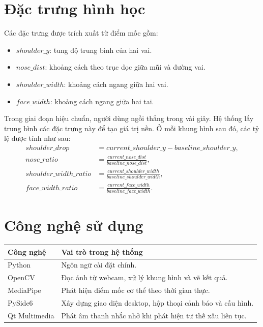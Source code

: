 \documentclass[12pt,a4paper,oneside]{report}
\begin{document}
\section{Đặc trưng hình học}
Các đặc trưng được trích xuất từ điểm mốc gồm:
\begin{itemize}[leftmargin=1.2cm]
    \item $shoulder\_y$: tung độ trung bình của hai vai.
    \item $nose\_dist$: khoảng cách theo trục dọc giữa mũi và đường vai.
    \item $shoulder\_width$: khoảng cách ngang giữa hai vai.
    \item $face\_width$: khoảng cách ngang giữa hai tai.
\end{itemize}

Trong giai đoạn hiệu chuẩn, người dùng ngồi thẳng trong vài giây. Hệ thống lấy trung bình các đặc trưng này để tạo giá trị nền. Ở mỗi khung hình sau đó, các tỷ lệ được tính như sau:
\begin{align}
    shoulder\_drop &= current\_shoulder\_y - baseline\_shoulder\_y, \\
    nose\_ratio &= \frac{current\_nose\_dist}{baseline\_nose\_dist}, \\
    shoulder\_width\_ratio &= \frac{current\_shoulder\_width}{baseline\_shoulder\_width}, \\
    face\_width\_ratio &= \frac{current\_face\_width}{baseline\_face\_width}.
\end{align}

\section{Công nghệ sử dụng}
\begin{longtable}{p{4cm}p{10cm}}
    \toprule
    \textbf{Công nghệ} & \textbf{Vai trò trong hệ thống} \\
    \midrule
    Python & Ngôn ngữ cài đặt chính. \\
    OpenCV & Đọc ảnh từ webcam, xử lý khung hình và vẽ kết quả. \\
    MediaPipe & Phát hiện điểm mốc cơ thể theo thời gian thực. \\
    PySide6 & Xây dựng giao diện desktop, hộp thoại cảnh báo và cấu hình. \\
    Qt Multimedia & Phát âm thanh nhắc nhở khi phát hiện tư thế xấu liên tục. \\
    \bottomrule
\end{longtable}
\end{document}
